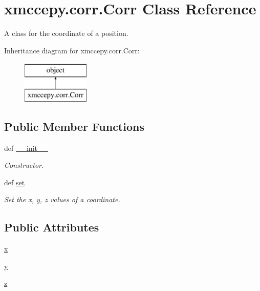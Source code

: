 \hypertarget{classxmccepy_1_1corr_1_1_corr}{\section{xmccepy.\-corr.\-Corr Class Reference}
\label{classxmccepy_1_1corr_1_1_corr}
}


A class for the coordinate of a position.  


Inheritance diagram for xmccepy.\-corr.\-Corr\-:\begin{figure}[H]
\begin{center}
\leavevmode
\includegraphics[height=2.000000cm]{classxmccepy_1_1corr_1_1_corr}
\end{center}
\end{figure}
\subsection*{Public Member Functions}
\begin{DoxyCompactItemize}
\item 
def \hyperlink{classxmccepy_1_1corr_1_1_corr_ab9af2823d754b0458bd814cc0ffa6d55}{\-\_\-\-\_\-init\-\_\-\-\_\-}
\begin{DoxyCompactList}\small\item\em Constructor. \end{DoxyCompactList}\item 
def \hyperlink{classxmccepy_1_1corr_1_1_corr_afdc411e79f72e2728c9eb5db1fba693f}{set}
\begin{DoxyCompactList}\small\item\em Set the x, y, z values of a coordinate. \end{DoxyCompactList}\end{DoxyCompactItemize}
\subsection*{Public Attributes}
\begin{DoxyCompactItemize}
\item 
\hyperlink{classxmccepy_1_1corr_1_1_corr_af92bf6894f8092d64bebdd641fba09f7}{x}
\item 
\hyperlink{classxmccepy_1_1corr_1_1_corr_a6a9298c2b8c4747dbd514dcde6b4e98d}{y}
\item 
\hyperlink{classxmccepy_1_1corr_1_1_corr_af4b31d22cd5524607542063be5b86a82}{z}
\end{DoxyCompactItemize}


